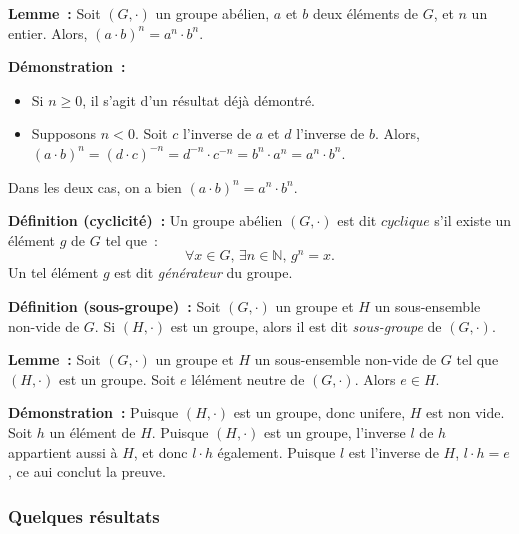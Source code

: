 \medskip

\noindent\textbf{Lemme :} Soit $(G, \cdot)$ un groupe abélien, $a$ et $b$ deux éléments de $G$, et $n$ un entier. 
    Alors, $(a \cdot b)^n = a^n \cdot b^n$.

\medskip

\noindent\textbf{Démonstration :} 
\begin{itemize}[nosep]
    \item Si $n \geq 0$, il s'agit d'un résultat déjà démontré.
    \item Supposons $n < 0$. 
        Soit $c$ l'inverse de $a$ et $d$ l'inverse de $b$.
        Alors, $(a \cdot b)^n = (d \cdot c)^{-n} = d^{-n} \cdot c^{-n} = b^n \cdot a^n = a^n \cdot b^n$.
\end{itemize}
Dans les deux cas, on a bien $(a \cdot b)^n = a^n \cdot b^n$.

\done

\medskip

\noindent\textbf{Définition (cyclicité) :} Un groupe abélien $(G, \cdot)$ est dit $\textit{cyclique}$ s'il existe un élément $g$ de $G$ tel que : 
    \begin{equation*}
        \forall x \in G, \, \exists n \in \mathbb{N}, \, g^n = x.
    \end{equation*}
    Un tel élément $g$ est dit \textit{générateur} du groupe.

\medskip

\noindent\textbf{Définition (sous-groupe) :} Soit $(G, \cdot)$ un groupe et $H$ un sous-ensemble non-vide de $G$.
    Si $(H, \cdot)$ est un groupe, alors il est dit \textit{sous-groupe} de $(G, \cdot)$.

\medskip

\noindent\textbf{Lemme :} Soit $(G, \cdot)$ un groupe et $H$ un sous-ensemble non-vide de $G$ tel que $(H, \cdot)$ est un groupe.
    Soit $e$ lélément neutre de $(G, \cdot)$. 
    Alors $e \in H$.

\medskip

\noindent\textbf{Démonstration :} Puisque $(H, \cdot)$ est un groupe, donc unifere, $H$ est non vide. 
    Soit $h$ un élément de $H$. 
    Puisque $(H, \cdot)$ est un groupe, l'inverse $l$ de $h$ appartient aussi à $H$, et donc $l \cdot h$ également. 
    Puisque $l$ est l'inverse de $H$, $l \cdot h = e$, ce aui conclut la preuve.

    \done

\subsubsection{Quelques résultats}

